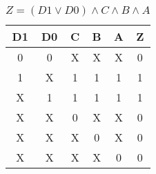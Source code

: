 
\begin{center}
    \begin{table}[h] \caption{\(Z = (D1 \lor D0) \land C \land B \land A \)}
        \begin{center}
            \begin{tabular}{|c|c|c|c|c||c|} \hline
            D1 & D0 & C & B & A & Z \\ \hline\hline
            0  & 0  & X & X & X & 0 \\ \hline
            1  & X  & 1 & 1 & 1 & 1 \\ \hline
            X  & 1  & 1 & 1 & 1 & 1 \\ \hline
            X  & X  & 0 & X & X & 0 \\ \hline
            X  & X  & X & 0 & X & 0 \\ \hline
            X  & X  & X & X & 0 & 0 \\ \hline
            \end{tabular}
        \end{center}
    \end{table}
\end{center}
